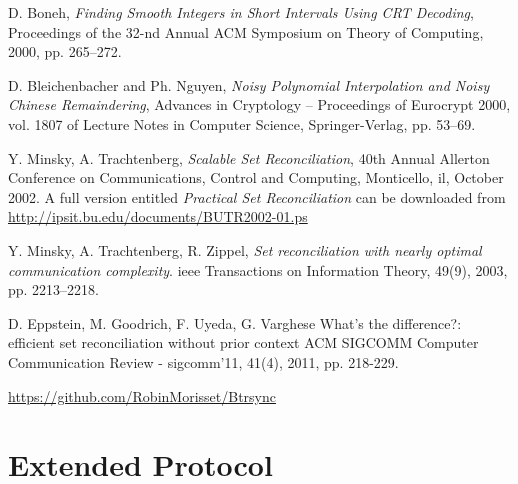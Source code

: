 \documentclass[11pt]{llncs}
\begin{document}
\begin{thebibliography}{30}

 D. Boneh, {\sl Finding Smooth Integers in Short Intervals Using CRT Decoding}, Proceedings of the 32-nd Annual ACM Symposium on Theory of Computing, 2000, pp. 265--272.

 D. Bleichenbacher and Ph. Nguyen, {\sl Noisy Polynomial Interpolation and Noisy Chinese Remaindering}, Advances in Cryptology -- Proceedings of Eurocrypt 2000, vol. 1807 of Lecture Notes in Computer Science, Springer-Verlag, pp. 53--69.

 Y. Minsky, A. Trachtenberg, {\sl Scalable Set Reconciliation}, 40th Annual Allerton Conference on Communications, Control and Computing, Monticello, {\sc il}, October 2002. A full version entitled {\sl Practical Set Reconciliation} can be downloaded from \url{http://ipsit.bu.edu/documents/BUTR2002-01.ps}

 Y. Minsky, A. Trachtenberg, R. Zippel, {\sl Set reconciliation with nearly optimal communication complexity}. {\sc ieee} Transactions on Information Theory, 49(9), 2003, pp. 2213–2218.

 D. Eppstein, M. Goodrich, F. Uyeda, G. Varghese What's the difference?: efficient set reconciliation without prior context
ACM SIGCOMM Computer Communication Review - {\sc sigcomm}'11, 41(4), 2011, pp. 218-229.

 \url{https://github.com/RobinMorisset/Btrsync}

\end{thebibliography}

\appendix

\section{Extended Protocol}
\label{sec:extended}
\end{document}
